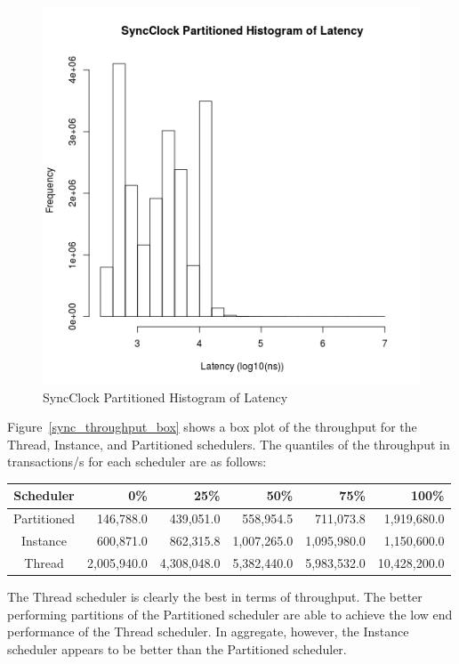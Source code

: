 \begin{figure}
\center
\includegraphics[height=.4\textheight]{sync_partitioned_latency_hist.png}
\caption{SyncClock Partitioned Histogram of Latency}
\label{sync_partitioned_latency}
\end{figure}

Figure~\ref{sync_throughput_box} shows a box plot of the throughput for the Thread, Instance, and Partitioned schedulers.
The quantiles of the throughput in transactions/s for each scheduler are as follows:
\begin{center}
\begin{tabular}{crrrrr}
Scheduler   &       0\%   &    25\%     &    50\%     &    75\%     &   100\% \\
\hline
Partitioned &   146,788.0 &   439,051.0 &   558,954.5 &   711,073.8 &  1,919,680.0 \\
Instance    &   600,871.0 &   862,315.8 & 1,007,265.0 & 1,095,980.0 &  1,150,600.0 \\
Thread      & 2,005,940.0 & 4,308,048.0 & 5,382,440.0 & 5,983,532.0 & 10,428,200.0 \\
\end{tabular}
\end{center}
The Thread scheduler is clearly the best in terms of throughput.
The better performing partitions of the Partitioned scheduler are able to achieve the low end performance of the Thread scheduler.
In aggregate, however, the Instance scheduler appears to be better than the Partitioned scheduler.

